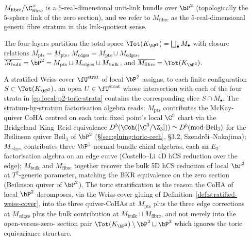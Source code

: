 \begin{example}
\begin{enumerate}
$M_{\mathrm{fibre}}/\C^\times_{\mathrm{fibre}}$ is a $5$-real-dimensional
unit-link bundle over $\bP^2$ (topologically the $5$-sphere link of the
zero section), and we refer to $M_{\mathrm{fibre}}$ as the
$5$-real-dimensional generic fibre stratum in this link-quotient sense.
\end{enumerate}
The four layers partition the total space $\Tot(K_{\bP^2}) =
\bigsqcup_\bullet M_\bullet$ with closure relations
$\overline{M_{\mathrm{pts}}} = M_{\mathrm{pts}}$,
$\overline{M_{\mathrm{edges}}} = M_{\mathrm{pts}} \cup M_{\mathrm{edges}}$,
$\overline{M_{\mathrm{bulk}}} = \bP^2 = M_{\mathrm{pts}} \cup
M_{\mathrm{edges}} \cup M_{\mathrm{bulk}}$, and $\overline{M_{\mathrm{fibre}}}
= \Tot(K_{\bP^2})$.

A stratified Weiss cover $\fU^{\mathrm{strat}}$ of local $\bP^2$
assigns, to each finite configuration $S \subset \Tot(K_{\bP^2})$, an
open $U \in \fU^{\mathrm{strat}}$ whose intersection with each of the
four strata in \eqref{eq:local-p2-toric-strata} contains the
corresponding slice $S \cap M_\bullet$. The stratum-by-stratum
factorisation algebra reads: $M_{\mathrm{pts}}$ contributes the
McKay-quiver CoHA centred on each toric fixed point's local $\C^3$
chart via the Bridgeland--King--Reid equivalence $D^b(\Coh([\C^3/\Z_3]))
\simeq D^b(\mathrm{mod}\text{-}\mathrm{Beil}_3)$ for the Beilinson
quiver $\mathrm{Beil}_3$ of $\bP^2$ (\S\ref{sec:gluing:toric-cech},
\S$3.2$, Szendr\H{o}i--Nakajima); $M_{\mathrm{edges}}$ contributes
three $\bP^1$-normal-bundle chiral algebras, each an
$E_2$-factorisation algebra on an edge curve (Costello--Li
\cite{CostelloLi2016} $4$D hCS reduction over the edge);
$M_{\mathrm{bulk}}$ and $M_{\mathrm{fibre}}$ together recover the
bulk 5D hCS reduction of local $\bP^2$ at $T^2$-generic parameter,
matching the BKR equivalence on the zero section (Beilinson quiver of
$\bP^2$). The toric stratification is the reason the CoHA of local
$\bP^2$ decomposes, via the Weiss-cover gluing of
Definition~\ref{def:stratified-weiss-cover}, into the three
quiver-CoHAs at $M_{\mathrm{pts}}$ plus the three edge corrections at
$M_{\mathrm{edges}}$ plus the bulk contribution at $M_{\mathrm{bulk}}
\sqcup M_{\mathrm{fibre}}$, and not merely into the open-versus-zero-
section pair $\Tot(K_{\bP^2}) \setminus \bP^2 \sqcup \bP^2$ which
ignores the toric equivariance structure.
\end{example}

